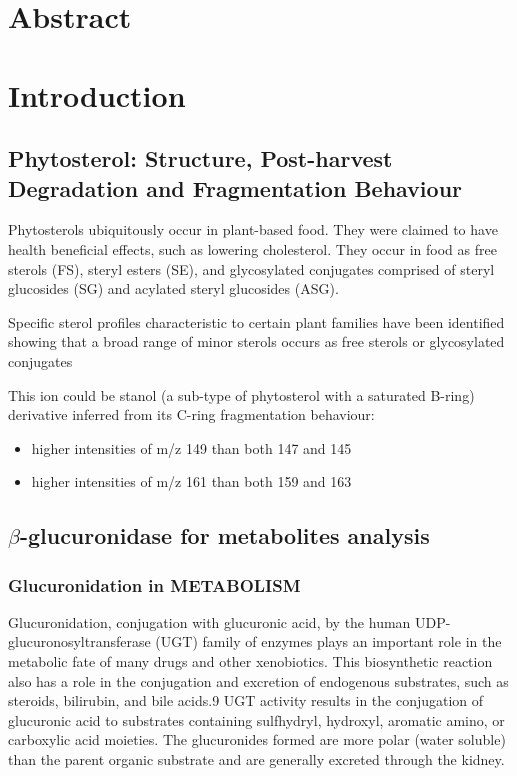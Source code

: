 \section{Abstract}

\section{Introduction}
\subsection{Phytosterol: Structure, Post-harvest Degradation and Fragmentation Behaviour}
Phytosterols ubiquitously occur in plant-based food\cite{sterolmsms}. They were claimed to have health beneficial effects, such as lowering cholesterol. They occur in food as free sterols (FS), steryl esters (SE), and glycosylated conjugates comprised of steryl glucosides (SG) and acylated steryl glucosides (ASG).

Specific sterol profiles characteristic to certain plant families have been identified showing that a broad range of minor sterols occurs as free sterols or glycosylated conjugates

This ion could be stanol (a sub-type of phytosterol with a saturated B-ring) derivative inferred from its C-ring fragmentation behaviour: 
\begin{itemize}
	\item higher intensities of m/z 149 than both 147 and 145
	\item higher intensities of m/z 161 than both 159 and 163
\end{itemize}
 

\subsection{$\beta$-glucuronidase for metabolites analysis}
\subsubsection{Glucuronidation in METABOLISM}
Glucuronidation, conjugation with glucuronic acid, by the human UDP-glucuronosyltransferase (UGT) family of enzymes plays an important role in the metabolic fate of many drugs and other xenobiotics. This biosynthetic reaction also has a role in the conjugation and excretion of endogenous substrates, such as steroids, bilirubin, and bile acids.9 UGT activity results in the conjugation of glucuronic acid to substrates containing sulfhydryl, hydroxyl, aromatic amino, or carboxylic acid moieties. The glucuronides formed are more polar (water soluble) than the parent organic substrate and are generally excreted through the kidney.

